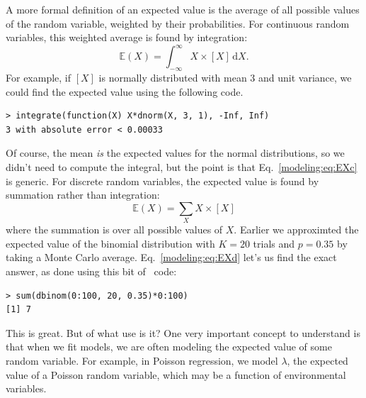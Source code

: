 A more formal definition of an expected value is the average of all
possible values of the random variable, weighted by their
probabilities. For continuous random variables, this weighted average
is found by integration: %
\begin{equation}
  \mathbb{E}(X) = \int_{-\infty}^{\infty} X \times [X] \, \text{d}{X}.
  \label{modeling:eq:EXc}
\end{equation}
For example, if $[X]$ is normally distributed with mean 3 and unit
variance, we could find the expected value using the following code.
\begin{verbatim}
> integrate(function(X) X*dnorm(X, 3, 1), -Inf, Inf)
3 with absolute error < 0.00033
\end{verbatim}
Of course, the mean \textit{is} the expected values for the normal
distributions, so we didn't need to compute the integral, but the
point is that Eq.~\ref{modeling:eq:EXc} is generic. For discrete
random variables, the expected value is found by summation rather than
integration: %
\begin{equation}
  \mathbb{E}(X) = \sum_{X} X \times [X]
  \label{modeling:eq:EXd}
\end{equation}
where the summation is over all possible values of $X$.
Earlier we
approximted the expected value of the binomial distribution
with $K=20$ trials and $p=0.35$ by taking a Monte Carlo
average. Eq.~\ref{modeling:eq:EXd} let's us
find the exact answer, as done using this bit of \R~code:
\begin{verbatim}
> sum(dbinom(0:100, 20, 0.35)*0:100)
[1] 7
\end{verbatim}
This is great. But of what use is it? One very
important concept to understand is that when we fit
models, we are often modeling the expected value of some random
variable. For example, in Poisson regression, we model $\lambda$, the
expected value of a Poisson random variable, which may be a function
of environmental variables.

